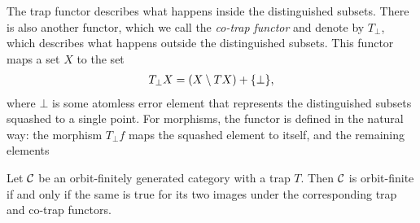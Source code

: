 The trap functor describes what happens inside the distinguished subsets. There is also another functor, which we call the \emph{co-trap functor} and  denote by $T_\bot$, which  describes what happens outside the distinguished subsets. This functor maps a set $X$ to the set 
\begin{align*}
T_\bot X = (X \setminus TX) + \{\bot\},
\end{align*}
where $\bot$ is some atomless error element that represents the  distinguished subsets  squashed to a single point. For morphisms, the functor is defined in the natural way: the morphism $T_\bot f$ maps the squashed element to itself, and the remaining elements

\begin{lemma}\label{lem:trap-co-trap}
    Let ${\mathcal C}$ be an orbit-finitely generated category with a trap $T$. Then ${\mathcal C}$ is orbit-finite if and only if the same is true for its two images under the corresponding trap and co-trap functors.
\end{lemma}
